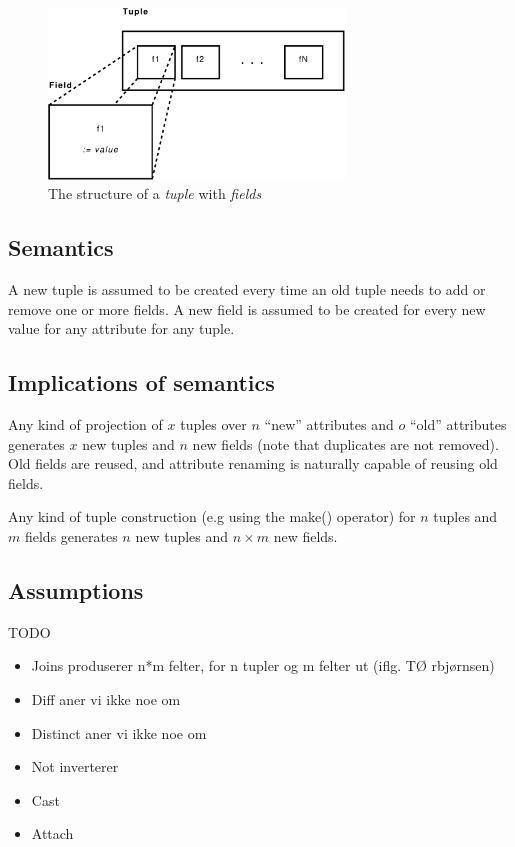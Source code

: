 \begin{figure}[htp]
\begin{center}
  \includegraphics[width=0.7\textwidth]{diagrams/tuple_post}
  \caption[Tuple/Field structure]{The structure of a \textit{tuple} with
  \textit{fields}}
  \label{fig:method:tuple_field}
\end{center}
\end{figure}

\subsection{Semantics}
A new tuple is assumed to be created every time an old tuple needs to add or
remove one or more fields. A new field is assumed to be created for every new
value for any attribute for any tuple.

\subsection{Implications of semantics}
Any kind of projection of $x$ tuples over $n$ ``new'' attributes and $o$
``old'' attributes generates $x$ new tuples and $n$ new fields (note that
duplicates are not removed). Old fields are reused, and attribute renaming
is naturally capable of reusing old fields.

Any kind of tuple construction (e.g using the \textsf{make()} operator)
for $n$ tuples and $m$ fields generates $n$ new tuples and $n \times m$ new
fields.

\subsection{Assumptions}
TODO
\begin{itemize}
  \item Joins produserer n*m felter, for n tupler og m felter ut (iflg. T\O
  rbj\o rnsen)
  \item Diff aner vi ikke noe om
  \item Distinct aner vi ikke noe om
  \item Not inverterer
  \item Cast 
  \item Attach
\end{itemize}